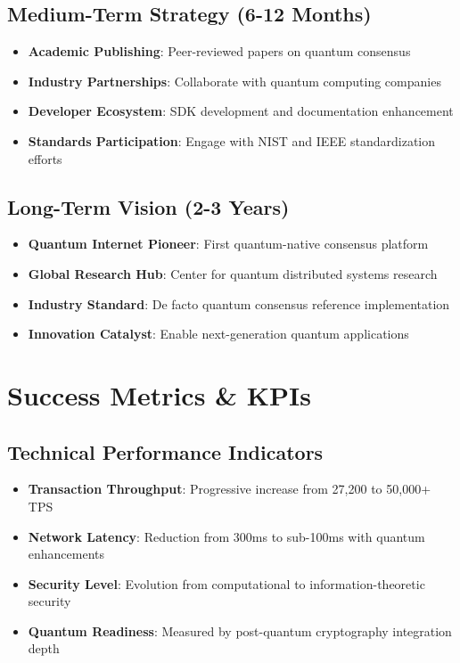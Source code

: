 \documentclass[11pt,a4paper]{article}
\begin{document}
\subsection{Medium-Term Strategy (6-12 Months)}

\begin{itemize}
\item \textbf{Academic Publishing}: Peer-reviewed papers on quantum consensus
\item \textbf{Industry Partnerships}: Collaborate with quantum computing companies
\item \textbf{Developer Ecosystem}: SDK development and documentation enhancement
\item \textbf{Standards Participation}: Engage with NIST and IEEE standardization efforts
\end{itemize}

\subsection{Long-Term Vision (2-3 Years)}

\begin{itemize}
\item \textbf{Quantum Internet Pioneer}: First quantum-native consensus platform
\item \textbf{Global Research Hub}: Center for quantum distributed systems research
\item \textbf{Industry Standard}: De facto quantum consensus reference implementation
\item \textbf{Innovation Catalyst}: Enable next-generation quantum applications
\end{itemize}

\section{Success Metrics \& KPIs}

\subsection{Technical Performance Indicators}

\begin{itemize}
\item \textbf{Transaction Throughput}: Progressive increase from 27,200 to 50,000+ TPS
\item \textbf{Network Latency}: Reduction from 300ms to sub-100ms with quantum enhancements
\item \textbf{Security Level}: Evolution from computational to information-theoretic security
\item \textbf{Quantum Readiness}: Measured by post-quantum cryptography integration depth
\end{itemize}
\end{document}
